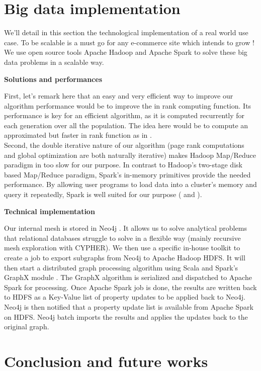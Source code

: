 \documentclass{iSWAGArticle}
\begin{document}
\section{Big data implementation}
We'll detail in this section the technological implementation of a real world use case.
To be scalable is a must go for any e-commerce site which intends to grow !
We use open source tools Apache Hadoop \cite{apache_hadoop} and Apache Spark \cite{spark} to solve these big data problems in a scalable way. 
\begin{center}
\textbf{\large Solutions and performances}
\end{center}
First, let's remark here that an easy and very efficient way to improve our algorithm performance would be to improve the in rank computing function. Its performance is key for an efficient algorithm, as it
is computed recurrently for each generation over all the population. The idea here would be to compute an approximated but faster in rank function as in \cite{page_rank_approx}.
\\\newline
Second, the double iterative nature of our algorithm (page rank computations and global optimization are both naturally iterative)
makes Hadoop Map/Reduce paradigm in \cite{map_reduce} too slow for our purpose. 
In contrast to Hadoop's two-stage disk based Map/Reduce paradigm, Spark's in-memory primitives provide the needed performance.
By allowing user programs to load data into a cluster's memory and query it repeatedly, Spark is well suited for our purpose (\cite{incremental_ram} and
\cite{spark_methodo}).
\\\newline
\begin{center}
\textbf{\large Technical implementation}
\end{center}
Our internal mesh is stored in Neo4j \cite{neo4j}. It allows us to solve analytical problems
 that relational databases struggle to solve in a flexible way (mainly recursive mesh exploration with CYPHER). 
 We then use a specific in-house toolkit to create a job to export subgraphs from Neo4j to Apache Hadoop HDFS.
 It will then start a distributed graph processing algorithm using Scala \cite{scala} and Spark's GraphX module \cite{graphX}. 
 The GraphX algorithm is serialized and dispatched to Apache Spark for processing.
Once Apache Spark job is done, the results are written back to HDFS as a Key-Value list of property updates to be applied back to Neo4j.
Neo4j is then notified that a property update list is available from Apache Spark on HDFS. Neo4j batch imports the results and applies the updates back to the original graph.
\section{Conclusion and future works}
\nocite{*}


\end{document}
